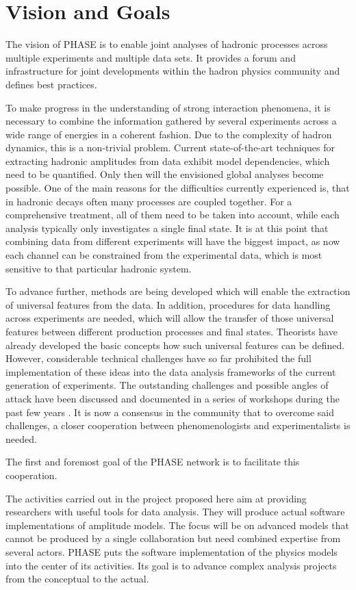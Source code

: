 \section{Vision and Goals}

The vision of PHASE is to enable joint analyses of hadronic processes across multiple experiments and multiple data sets. It provides a forum and infrastructure for joint developments within the hadron physics community and defines best practices.

To make progress in the understanding of strong interaction phenomena, it is necessary to combine the information gathered by several experiments across a wide range of energies in a coherent fashion. Due to the complexity of hadron dynamics, this is a non-trivial problem. Current state-of-the-art techniques for extracting hadronic amplitudes from data exhibit model dependencies, which need to be quantified. Only then will the envisioned global analyses become possible. One of the main reasons for the difficulties currently experienced is, that in hadronic decays often many processes are coupled together. For a comprehensive treatment, all of them need to be taken into account, while each analysis typically only investigates a single final state. It is at this point that combining data from different experiments will have the biggest impact, as now each channel can be constrained from the experimental data, which is most sensitive to that particular hadronic system.

To advance further, methods are being developed which will enable the extraction of universal features from the data. In addition, procedures for data handling across experiments are needed, which will allow the transfer of those universal features between different production processes and final states. Theorists have already developed the basic concepts how such universal features can be defined. However, considerable technical challenges have so far prohibited the full implementation of these ideas into the data analysis frameworks of the current generation of experiments. The outstanding challenges and possible angles of attack have been discussed and documented in a series of workshops during the past few years \cite{Battaglieri_2015, Brice_o_2016, Lutz_2016}. It is now a consensus in the community that to overcome said challenges, a closer cooperation between phenomenologists and experimentalists is needed.

The first and foremost goal of the PHASE network is to facilitate this cooperation. 

The activities carried out in the project proposed here aim at providing researchers with useful tools for data analysis. They will produce actual software implementations of amplitude models. The focus will be on advanced models that cannot be produced by a single collaboration but need combined expertise from several actors. PHASE puts the software implementation of the physics models into the center of its activities. Its goal is to advance complex analysis projects from the conceptual to the actual.





